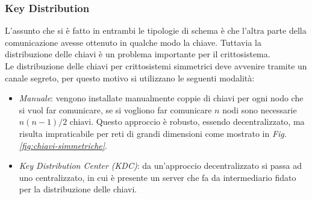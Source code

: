 

\subsubsection*{Key Distribution}

L'assunto che si è fatto in entrambi le tipologie di schema è che l'altra parte della comunicazione avesse ottenuto in qualche modo la chiave. Tuttavia la distribuzione
delle chiavi è un problema importante per il crittosistema. \\

\noindent
Le distribuzione delle chiavi per crittosistemi simmetrici deve avvenire tramite un canale segreto, per questo motivo si utilizzano le seguenti modalità:
\begin{itemize}
    \item \textit{Manuale}: vengono installate manualmente coppie di chiavi per ogni nodo che si vuol far comunicare, se si vogliono far comunicare $n$ nodi 
    sono necessarie $n(n-1)/2$ chiavi. Questo approccio è robusto, essendo decentralizzato,  ma risulta impraticabile per reti di grandi dimensioni come mostrato in \textit{Fig. \ref{fig:chiavi-simmetriche}}.
    \item \textit{Key Distribution Center (KDC)}: da un'approccio decentralizzato si passa ad uno centralizzato, in cui è presente un server che fa da intermediario
    fidato per la distribuzione delle chiavi.
\end{itemize}

